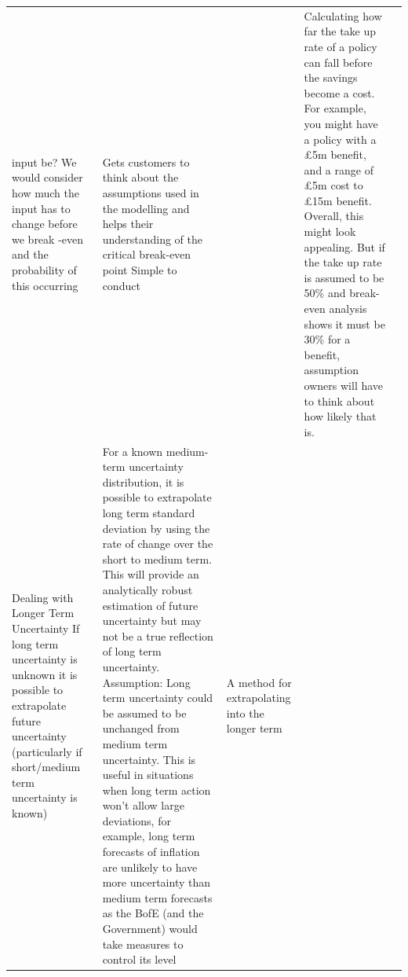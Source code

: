\documentclass[]{book}
\begin{document}
\begin{longtable}[]{@{}lllll@{}}
\begin{minipage}[t]{0.26\columnwidth}
input be? We would consider how much the input has to change before we
break -even and the probability of this occurring\strut
\end{minipage} & \begin{minipage}[t]{0.16\columnwidth}\raggedright\strut
Gets customers to think about the assumptions used in the modelling and
helps their understanding of the critical break-even point Simple to
conduct\strut
\end{minipage} & \begin{minipage}[t]{0.16\columnwidth}\raggedright\strut
\strut
\end{minipage} & \begin{minipage}[t]{0.13\columnwidth}\raggedright\strut
Calculating how far the take up rate of a policy can fall before the
savings become a cost. For example, you might have a policy with a £5m
benefit, and a range of £5m cost to £15m benefit. Overall, this might
look appealing. But if the take up rate is assumed to be 50\% and
break-even analysis shows it must be 30\% for a benefit, assumption
owners will have to think about how likely that is.\strut
\end{minipage}\tabularnewline
\begin{minipage}[t]{0.16\columnwidth}\raggedright\strut
 Dealing with Longer Term Uncertainty If long term uncertainty is
unknown it is possible to extrapolate future uncertainty (particularly
if short/medium term uncertainty is known)\strut
\end{minipage} & \begin{minipage}[t]{0.26\columnwidth}\raggedright\strut
For a known medium-term uncertainty distribution, it is possible to
extrapolate long term standard deviation by using the rate of change
over the short to medium term. This will provide an analytically robust
estimation of future uncertainty but may not be a true reflection of
long term uncertainty. Assumption: Long term uncertainty could be
assumed to be unchanged from medium term uncertainty. This is useful in
situations when long term action won't allow large deviations, for
example, long term forecasts of inflation are unlikely to have more
uncertainty than medium term forecasts as the BofE (and the Government)
would take measures to control its level\strut
\end{minipage} & \begin{minipage}[t]{0.16\columnwidth}\raggedright\strut
A method for extrapolating into the longer term\strut
\end{minipage} & \begin{minipage}[t]{0.16\columnwidth}\raggedright\strut

\end{minipage}
\end{longtable}
\end{document}
